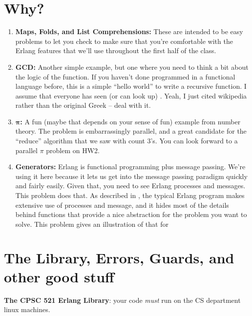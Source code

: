 \documentclass{article}
\begin{document}
\section*{Why?}
\begin{enumerate}
  \item \textbf{Maps, Folds, and List Comprehensions:}  These are intended to be easy problems
    to let you check to make sure that you're comfortable with the Erlang features that we'll
    use throughout the first half of the class.
  \item \textbf{GCD:}  Another simple example, but one where you need to think a bit about the logic of the function.
    If you haven't done programmed in a functional language before, this is a simple ``hello world'' to
    write a recursive function.  I assume that everyone has seen (or can look up)
    .
    Yeah, I just cited wikipedia rather than the original Greek -- deal with it.
  \item \textbf{$\mathbf{\pi}$:}  A fun (maybe that depends on your sense of fun) example from number theory.
    The problem is embarrassingly parallel, and a great candidate for the ``reduce'' algorithm that we saw
    with count 3's.  You can look forward to a parallel $\pi$ problem on HW2.
  \item \textbf{Generators:} Erlang is functional programming plus message passing.  We're using it here
    because it lets us get into the message passing paradigm quickly and fairly easily.  Given that, you
    need to see Erlang processes and messages.  This problem does that.
    As described in \lyse{}, the typical Erlang program makes extensive use of processes and message,
    and it hides most of the details behind functions that provide a nice abstraction for the problem
    you want to solve.  This problem gives an illustration of that for 
\end{enumerate}

\section*{The Library, Errors, Guards, and other good stuff}
\textbf{The CPSC 521 Erlang Library}: your code \emph{must} run on the CS department linux machines.
\end{document}
